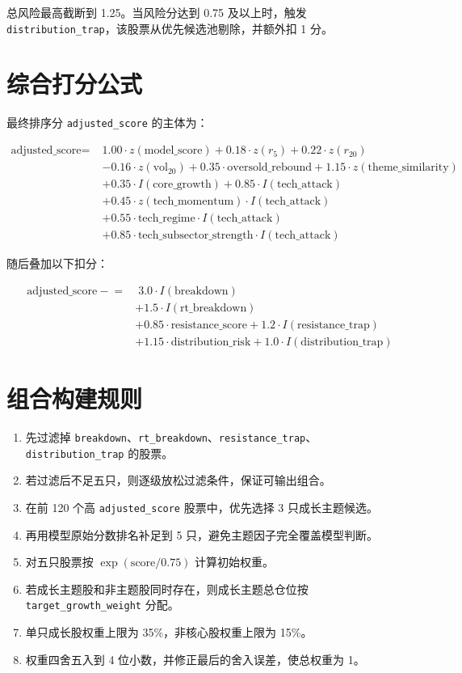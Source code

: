 \documentclass[UTF8,zihao=-4]{ctexart}
\begin{document}
总风险最高截断到 1.25。当风险分达到 0.75 及以上时，触发 \texttt{distribution\_trap}，该股票从优先候选池剔除，并额外扣 1 分。

\section{综合打分公式}

最终排序分 \texttt{adjusted\_score} 的主体为：

\[
\begin{aligned}
\text{adjusted\_score} =\;&
1.00 \cdot z(\text{model\_score})
+ 0.18 \cdot z(r_5)
+ 0.22 \cdot z(r_{20}) \\
&- 0.16 \cdot z(\text{vol}_{20})
+ 0.35 \cdot \text{oversold\_rebound}
+ 1.15 \cdot z(\text{theme\_similarity}) \\
&+ 0.35 \cdot I(\text{core\_growth})
+ 0.85 \cdot I(\text{tech\_attack}) \\
&+ 0.45 \cdot z(\text{tech\_momentum}) \cdot I(\text{tech\_attack}) \\
&+ 0.55 \cdot \text{tech\_regime} \cdot I(\text{tech\_attack}) \\
&+ 0.85 \cdot \text{tech\_subsector\_strength} \cdot I(\text{tech\_attack})
\end{aligned}
\]

随后叠加以下扣分：

\[
\begin{aligned}
\text{adjusted\_score} \mathrel{-}= &\; 3.0 \cdot I(\text{breakdown}) \\
&+ 1.5 \cdot I(\text{rt\_breakdown}) \\
&+ 0.85 \cdot \text{resistance\_score}
+ 1.2 \cdot I(\text{resistance\_trap}) \\
&+ 1.15 \cdot \text{distribution\_risk}
+ 1.0 \cdot I(\text{distribution\_trap})
\end{aligned}
\]

\section{组合构建规则}

\begin{enumerate}
  \item 先过滤掉 \texttt{breakdown}、\texttt{rt\_breakdown}、\texttt{resistance\_trap}、\texttt{distribution\_trap} 的股票。
  \item 若过滤后不足五只，则逐级放松过滤条件，保证可输出组合。
  \item 在前 120 个高 \texttt{adjusted\_score} 股票中，优先选择 3 只成长主题候选。
  \item 再用模型原始分数排名补足到 5 只，避免主题因子完全覆盖模型判断。
  \item 对五只股票按 \(\exp(\text{score}/0.75)\) 计算初始权重。
  \item 若成长主题股和非主题股同时存在，则成长主题总仓位按 \texttt{target\_growth\_weight} 分配。
  \item 单只成长股权重上限为 35\%，非核心股权重上限为 15\%。
  \item 权重四舍五入到 4 位小数，并修正最后的舍入误差，使总权重为 1。
\end{enumerate}
\end{document}
